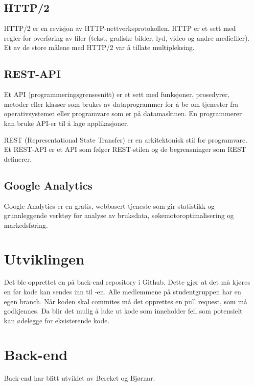 \subsection{HTTP/2}
HTTP/2 \cite{Belshe2015httpv} er en revisjon av HTTP-nettverksprotokollen. HTTP er et sett med regler for overføring av filer (tekst, grafiske bilder, lyd, video og andre mediefiler). Et av de store målene med HTTP/2 var å tillate multipleksing.

\subsection{REST-API}
Et API (programmeringsgrensesnitt) er et sett med funksjoner, prosedyrer, metoder eller klasser som brukes av dataprogrammer for å be om tjenester fra operativsystemet eller programvare som er på datamaskinen. En programmerer kan bruke API-er til å lage applikasjoner.

REST (Representational State Transfer) er en arkitektonisk stil for programvare. Et REST-API \cite{Masse2011radr} er et API som følger REST-stilen og de begrensninger som REST definerer.

\subsection{Google Analytics}
\label{sec:google-analytics}
Google Analytics \cite{google2019gtk} er en gratis, webbasert tjeneste som gir statistikk og grunnleggende verktøy for analyse av bruksdata, søkemotoroptimalisering og markedsføring.

\section{Utviklingen}

Det ble opprettet en  på back-end repository i Github. Dette gjør at det må kjøres en  før kode kan sendes inn til -en. Alle medlemmene på studentgruppen har en egen branch.
Når koden skal commites må det opprettes en pull request, som må godkjennes. Da blir det mulig å luke ut kode som inneholder feil som potensielt kan ødelegge for eksisterende kode.

\section{Back-end}
Back-end har blitt utviklet av Bereket og Bjørnar.


